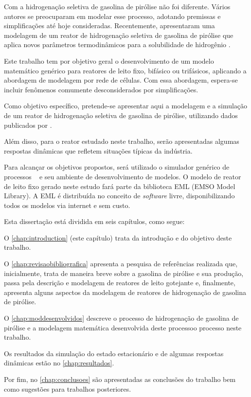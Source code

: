 Com a hidrogenação seletiva de gasolina de pirólise não
foi diferente. Vários autores se preocuparam em modelar esse
processo, adotando premissas e simplificações até hoje consideradas.
Recentemente,  apresentaram uma modelagem de
um reator de hidrogenação seletiva de gasolina de pirólise que aplica novos
parâmetros termodinâmicos para a solubilidade de hidrogênio \cite{Rojas2014}. 

Este trabalho tem por objetivo geral o desenvolvimento de um modelo
matemático genérico para reatores de leito fixo, bifásico ou trifásicos,
aplicando a abordagem de modelagem por rede de células. Com essa
abordagem, espera-se incluir fenômenos comumente desconsiderados por
simplificações.

Como objetivo específico, pretende-se apresentar aqui a modelagem e a
simulação de um reator de hidrogenação seletiva de gasolina de pirólise,
utilizando dados publicados por .

Além disso, para o reator estudado neste trabalho, serão
apresentadas algumas respostas dinâmicas que refletem situações típicas da
indústria.

Para alcançar os objetivos propostos, será utilizado o simulador genérico de
processos \emso\ \cite{Soares2003} e seu ambiente de desenvolvimento de
modelos. O modelo de reator de leito fixo gerado neste estudo fará parte da
biblioteca EML (EMSO Model Library). A EML é distribuída no conceito de
\emph{software} livre, disponibilizando todos os modelos via internet e sem custo.

Esta dissertação está dividida em seis capítulos, como segue:

O \autoref{chap:introduction} (este capítulo) trata da introdução e do objetivo deste trabalho.

O \autoref{chap:revisaobibliografica} apresenta a pesquisa de referências
realizada que, inicialmente, trata de maneira breve sobre a gasolina de pirólise
e sua produção, passa pela descrição e modelagem de reatores de leito
gotejante e, finalmente, apresenta alguns aspectos da modelagem de
reatores de hidrogenação de gasolina de pirólise.

O \autoref{chap:moddesenvolvidos} descreve o processo de
hidrogenação de gasolina de pirólise e a modelagem matemática
desenvolvida deste processoo processo neste trabalho.

Os resultados da simulação do estado estacionário e de algumas
respostas dinâmicas estão no \autoref{chap:resultados}.

Por fim, no \autoref{chap:conclusoes} são apresentadas as conclusões do
trabalho bem como sugestões para trabalhos posteriores.
